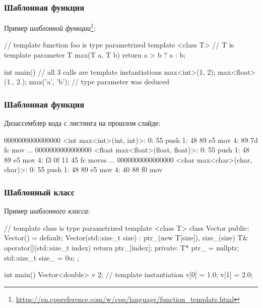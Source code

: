 \documentclass[compress, 8pt, aspectratio=169]{beamer}
\begin{document}
  \begin{frame}[fragile]

    \frametitle{Шаблонная функция}

    Пример \textit{шаблонной функции}\footnote{\url{https://en.cppreference.com/w/cpp/language/function\_template.html}}:

    \begin{myinplacelisting}[minted language=cpp]
// template function foo is type parametrized
template <class T> // T is template parameter
T max(T a, T b)
{
    return a > b ? a : b;
}

int main() {
    // all 3 calls are template instantiations
    max<int>(1, 2);
    max<float>(1., 2.);
    max('a', 'b'); // type parameter was deduced
}
    \end{myinplacelisting}

  \end{frame}

  \begin{frame}[fragile]

    \frametitle{Шаблонная функция}

    Дизассемблер кода с листинга на прошлом слайде:

    \begin{myinplacelisting}[minted language=text]
0000000000000000 <int max<int>(int, int)>:
   0:   55                      push   %
   1:   48 89 e5                mov    %
   4:   89 7d fc                mov    %
...
0000000000000000 <float max<float>(float, float)>:
   0:   55                      push   %
   1:   48 89 e5                mov    %
   4:   f3 0f 11 45 fc          movss  %
...
0000000000000000 <char max<char>(char, char)>:
   0:   55                      push   %
   1:   48 89 e5                mov    %
   4:   40 88 f0                mov    %
    \end{myinplacelisting}

  \end{frame}

  \begin{frame}[fragile]

    \frametitle{Шаблонный класс}

    Пример \textit{шаблонного класса}\footnotemark{}:


    \begin{myinplacelisting}[minted language=cpp]
// template class is type parametrized
template <class T>
class Vector {
public:
    Vector() = default;
    Vector(std::size_t size) : ptr_(new T[size]), size_(size)
    {}
    T& operator[](std::size_t index) { return ptr_[index]; }
private:
    T* ptr_ = nullptr;
    std::size_t size_ = 0u;
};

int main() {
    Vector<double> v {2}; // template instantiation
    v[0] = 1.0;
    v[1] = 2.0;
}
    \end{myinplacelisting}

  \end{frame}
\end{document}
